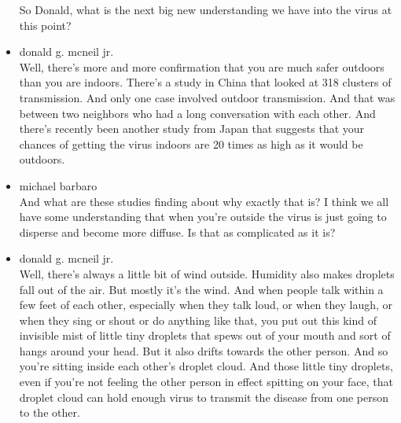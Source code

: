 \begin{itemize}
  So Donald, what is the next big new understanding we have into the
  virus at this point?
\item
  donald g. mcneil jr.\\
  Well, there's more and more confirmation that you are much safer
  outdoors than you are indoors. There's a study in China that looked at
  318 clusters of transmission. And only one case involved outdoor
  transmission. And that was between two neighbors who had a long
  conversation with each other. And there's recently been another study
  from Japan that suggests that your chances of getting the virus
  indoors are 20 times as high as it would be outdoors.
\item
  michael barbaro\\
  And what are these studies finding about why exactly that is? I think
  we all have some understanding that when you're outside the virus is
  just going to disperse and become more diffuse. Is that as complicated
  as it is?
\item
  donald g. mcneil jr.\\
  Well, there's always a little bit of wind outside. Humidity also makes
  droplets fall out of the air. But mostly it's the wind. And when
  people talk within a few feet of each other, especially when they talk
  loud, or when they laugh, or when they sing or shout or do anything
  like that, you put out this kind of invisible mist of little tiny
  droplets that spews out of your mouth and sort of hangs around your
  head. But it also drifts towards the other person. And so you're
  sitting inside each other's droplet cloud. And those little tiny
  droplets, even if you're not feeling the other person in effect
  spitting on your face, that droplet cloud can hold enough virus to
  transmit the disease from one person to the other.


\end{itemize}

